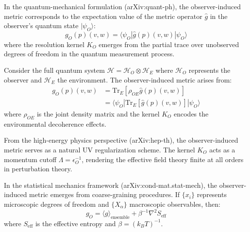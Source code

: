 \begin{theorem}\label{thm:bk4_quantum_measurement}
In the quantum-mechanical formulation (arXiv:quant-ph), the observer-induced metric corresponds to the expectation value of the metric operator $\hat{g}$ in the observer's quantum state $|\psi_O\rangle$:
\begin{equation}
    g_O(p)(v,w) = \langle \psi_O | \hat{g}(p)(v,w) | \psi_O \rangle
\end{equation}
where the resolution kernel $K_O$ emerges from the partial trace over unobserved degrees of freedom in the quantum measurement process.
\end{theorem}

\begin{demonstratio}
Consider the full quantum system $\mathcal{H} = \mathcal{H}_O \otimes \mathcal{H}_E$ where $\mathcal{H}_O$ represents the observer and $\mathcal{H}_E$ the environment. The observer-induced metric arises from:
\begin{align}
    g_O(p)(v,w) &= \text{Tr}_E[\rho_{OE} \hat{g}(p)(v,w)] \\
    &= \langle \psi_O | \text{Tr}_E[\hat{g}(p)(v,w)] | \psi_O \rangle
\end{align}
where $\rho_{OE}$ is the joint density matrix and the kernel $K_O$ encodes the environmental decoherence effects.
\end{demonstratio}

\begin{proposition}\label{prop:bk4_field_regularization}
From the high-energy physics perspective (arXiv:hep-th), the observer-induced metric serves as a natural UV regularization scheme. The kernel $K_O$ acts as a momentum cutoff $\Lambda = \epsilon_O^{-1}$, rendering the effective field theory finite at all orders in perturbation theory.
\end{proposition}

\begin{lemma}\label{lem:bk4_statistical_mechanics}
In the statistical mechanics framework (arXiv:cond-mat.stat-mech), the observer-induced metric emerges from coarse-graining procedures. If $\{x_i\}$ represents microscopic degrees of freedom and $\{X_\alpha\}$ macroscopic observables, then:
\begin{equation}
    g_O = \langle g \rangle_{\text{ensemble}} + \beta^{-1} \nabla^2 S_{\text{eff}}
\end{equation}
where $S_{\text{eff}}$ is the effective entropy and $\beta = (k_B T)^{-1}$.
\end{lemma}

